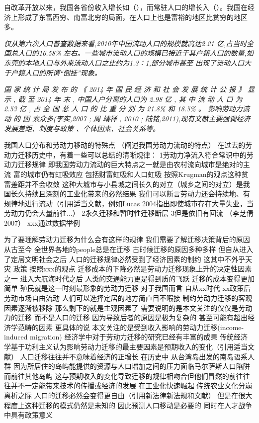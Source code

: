 \documentclass[a4paper,10pt]{article}
\begin{document}
自改革开放以来，我国各省份收入增长如（），而常驻人口的增长入（）。我国在经济上形成了东富西穷、南富北穷的局面，在人口上也是富裕的地区比贫穷的地区多。


\textit{仅从第六次人口普查数据来看,2010年中国流动人口的规模就高达2.21 亿,占当时全国总人口的16.58\% 左右。一些城市流动人口的规模已接近于其户籍人口的数量,如东莞的本地人口与外来流动人口之比约为1.3∶1,部分城市甚至  出现了流动人口大于户籍人口的所谓“倒挂”现象。}

\textit{国 家 统 计 局 发 布 的 《 2014 年 国 民 经 济 和 社 会 发 展 统 计 公 报 》 显 示 , 截 至 2014 年 末 , 中国人户分离的人口为 2.98 亿 , 其 中 流 动 人 口 为 2.53 亿 , 占 全 国 总 人 口 的 比 重 分 别 为 21.8\% 和 18.5\% 。 影响劳动力流动 的 因 素众多(李实,2007 ; 周 靖祥 , 2010 ; 陆铭,2011),现有文献主要强调经济发展差距、制度与政策 、个体因素、社会关系等。}

我国人口分布和劳动力移动的特殊点
（阐述我国劳动力流动的特点）
在过去的劳动力迁移历史中，有着一些可以总结的清晰规律：
1劳动力净流入符合常识中的劳动力迁移规律
即我国劳动力流动的巨大特点之一就是由农村流向城市是绝对的主流
富的城市仍有虹吸效应 包括财富虹吸和人口虹吸 按照Krugman的观点这种贫富差距并不会收敛
这种大城市与小县城之间长久的对立（城乡之间的对立）是我国长久持续且深刻的工业化带来的必然结果 
我们可以断言劳动力还会持续地、有规律地进行流动（引用适当文献，例如Lucas 2004指出即使城市存在大量失业，当劳动力仍会大量前往...）
2永久迁移和暂时性迁移断层
3但是依旧有回流
（李芝倩2007）
xxx通过数据举例

为了要理解劳动力迁移为什么会有这样的规律
我们需要了解迁移决策背后的原因
从古至今 全世界各地的people总是在迁移
古时候迁移的原因多种多样
但自从进入了定居文明社会之后 人口的迁移规律必然受到了经济因素的制约
这其中不外乎天灾 政策
按照xxx的观点 迁移成本的下降必然是劳动力迁移现象上升的决定性因素之一
进入大航海时代之后 人类的交通能力更是得到质的飞跃 迁移的成本变得更加简单 殖民就是这一时刻最形象的劳动力迁移
对于我国而言 自从xx时代 xx政策后 劳动市场自由流动 人们可以选择定居的地方简直目不暇接
制约劳动力迁移的客观因素逐渐被移除 那么剩下的就是主观因素了
需要说明的是本文关注的仅仅是劳动力的迁移 而不是人口的迁移 因为导致后者的原因是极为复杂的 甚至可能有超出经济学范畴的因素 更具体的说 本文关注的是受到收入影响的劳动力迁移(income-induced migration)
经济学中对于劳动力迁移的研究已经有丰富的成果
传统经济学基于功利主义认为影响劳动力迁移的最主要因素是预期收入的变化（引用适当文献）
人口迁移往往并不意味着经济的正增长 在历史中 从台湾岛出发的南岛语系人群 因为所居住的岛屿能提供的资源与人口增加之间的压力面临马尔萨斯人口陷阱而前往其他岛屿 这与预期收入的变化导致迁移的规律相吻合但他们冒然的前往往往并不一定能带来技术的传播或经济的发展
在工业化快速崛起 传统农业文化分崩离析之际 人口的迁移必然会变得更自由（引用新法律新法规和文献） 但是在很大程度上这种迁移的模式仍然是未知的 因此预测人口移动是必要的
同时在人才战争中具有政策意义 
\end{document}
